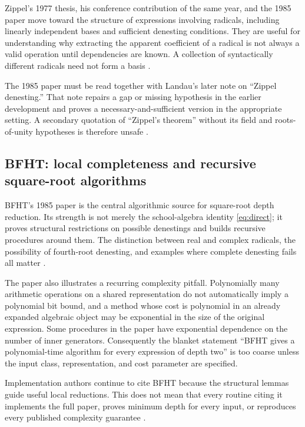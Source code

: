 \documentclass[11pt,oneside]{article}
\numberwithin{equation}{section}
\theoremstyle{definition}
\theoremstyle{remark}
\begin{document}
Zippel's 1977 thesis, his conference contribution of the same year, and the 1985 paper move toward the structure of expressions involving radicals, including linearly independent bases and sufficient denesting conditions. They are useful for understanding why extracting the apparent coefficient of a radical is not always a valid operation until dependencies are known. A collection of syntactically different radicals need not form a basis \cite{zippel77,zippel1977,zippel85}.

The 1985 paper must be read together with Landau's later note on ``Zippel denesting.'' That note repairs a gap or missing hypothesis in the earlier development and proves a necessary-and-sufficient version in the appropriate setting. A secondary quotation of ``Zippel's theorem'' without its field and roots-of-unity hypotheses is therefore unsafe \cite{landauzippel}.

\subsection{BFHT: local completeness and recursive square-root algorithms}
BFHT's 1985 paper is the central algorithmic source for square-root depth reduction. Its strength is not merely the school-algebra identity \eqref{eq:direct}; it proves structural restrictions on possible denestings and builds recursive procedures around them. The distinction between real and complex radicals, the possibility of fourth-root denesting, and examples where complete denesting fails all matter \cite{bfht}.

The paper also illustrates a recurring complexity pitfall. Polynomially many arithmetic operations on a shared representation do not automatically imply a polynomial bit bound, and a method whose cost is polynomial in an already expanded algebraic object may be exponential in the size of the original expression. Some procedures in the paper have exponential dependence on the number of inner generators. Consequently the blanket statement ``BFHT gives a polynomial-time algorithm for every expression of depth two'' is too coarse unless the input class, representation, and cost parameter are specified.

Implementation authors continue to cite BFHT because the structural lemmas guide useful local reductions. This does not mean that every routine citing it implements the full paper, proves minimum depth for every input, or reproduces every published complexity guarantee \cite{sympy,maxima,jeffrey}.
\end{document}
